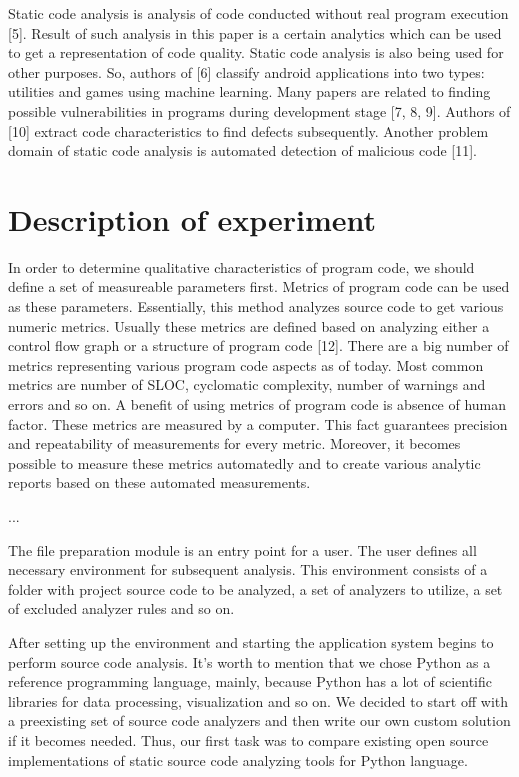 \documentclass[runningheads,a4paper]{llncs}
\begin{document}
Static code analysis is analysis of code conducted without real program
execution [5]. Result of such analysis in this paper is a certain analytics
which can be used to get a representation of code quality. Static code analysis
is also being used for other purposes. So, authors of [6] classify android
applications into two types: utilities and games using machine learning.
Many papers are related to finding possible vulnerabilities in programs
during development stage [7, 8, 9]. Authors of [10] extract code characteristics
to find defects subsequently. Another problem domain of static code analysis
is automated detection of malicious code [11].

\section{Description of experiment}

In order to determine qualitative characteristics of program code, we should
define a set of measureable parameters first. Metrics of program code can
be used as these parameters. Essentially, this method analyzes source code
to get various numeric metrics. Usually these metrics are defined based
on analyzing either a control flow graph or a structure of program code [12].
There are a big number of metrics representing various program code aspects
as of today. Most common metrics are number of SLOC, cyclomatic complexity,
number of warnings and errors and so on. A benefit of using metrics of program
code is absence of human factor. These metrics are measured by a computer.
This fact guarantees precision and repeatability of measurements for every
metric. Moreover, it becomes possible to measure these metrics automatedly
and to create various analytic reports based on these automated measurements.

...

The file preparation module is an entry point for a user. The user defines
all necessary environment for subsequent analysis. This environment consists
of a folder with project source code to be analyzed, a set of analyzers
to utilize, a set of excluded analyzer rules and so on.

After setting up the environment and starting the application system begins
to perform source code analysis. It’s worth to mention that we chose Python
as a reference programming language, mainly, because Python has a lot of
scientific libraries for data processing, visualization and so on. We decided
to start off with a preexisting set of source code analyzers and then write
our own custom solution if it becomes needed. Thus, our first task was to
compare existing open source implementations of static source code
analyzing tools for Python language.
\end{document}

